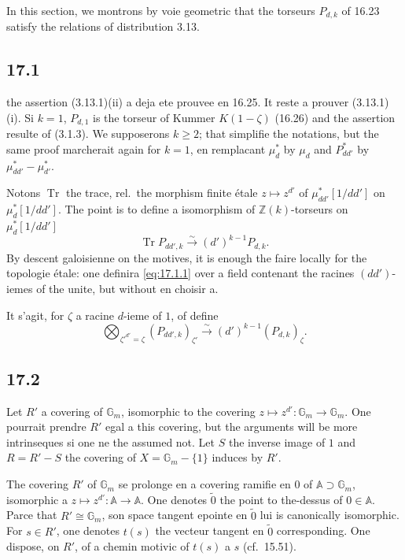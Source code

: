 \documentclass[12pt,a4paper]{article}
\theoremstyle{plain}
\theoremstyle{definition}
\theoremstyle{remark}
\DeclareMathOperator{\Tr}{Tr}
\newcommand{\Gm}{\mathbb{G}_m}
\newcommand{\ZZ}{\mathbb{Z}}
\newcommand{\GA}{\mathbb{A}}
\begin{document}
In this section, we montrons by voie geometric that the
torseurs $P_{d,k}$ of 16.23 satisfy the relations of distribution 3.13.

\subsection{17.1}

the assertion (3.13.1)(ii) a deja ete prouvee en 16.25. It reste a
prouver (3.13.1)(i). Si $k=1$, $P_{d,1}$ is the torseur of Kummer
$K(1-\zeta)$ (16.26) and the assertion resulte of (3.1.3). We
supposerons $k \geq 2$; that simplifie the notations, but the same
proof marcherait again for $k=1$, en remplacant $\mu_d^*$ by
$\mu_d$ and $P_{dd'}^*$ by $\mu_{dd'}^* - \mu_{d'}^*$.

Notons $\Tr$ the trace, rel.\ the morphism finite étale
$z \mapsto z^{d'}$ of $\mu_{dd'}^*[1/dd']$ on $\mu_d^*[1/dd']$. The point is to define a isomorphism of $\ZZ(k)$-torseurs on
$\mu_d^*[1/dd']$
\begin{equation}\label{eq:17.1.1}
\Tr P_{dd',k} \xrightarrow{\sim} (d')^{k-1} P_{d,k}.
\end{equation}
By descent galoisienne on the motives, it is enough the faire locally
for the topologie étale: one definira \eqref{eq:17.1.1} over a field
contenant the racines $(dd')$-iemes of the unite, but without en choisir
a.

It s'agit, for $\zeta$ a racine $d$-ieme of $1$, of define
\begin{equation}\label{eq:17.1.2}
\bigotimes_{\zeta'^{d'}=\zeta} (P_{dd',k})_{\zeta'}
\xrightarrow{\sim} (d')^{k-1}(P_{d,k})_\zeta.
\end{equation}

\subsection{17.2}

Let $R'$ a covering of $\Gm$, isomorphic to the covering
$z \mapsto z^{d'} : \Gm \to \Gm$. One pourrait prendre $R'$ egal a this
covering, but the arguments will be more intrinseques si one ne the
assumed not. Let $S$ the inverse image of $1$ and $R = R' - S$ the
covering of $X = \Gm - \{1\}$ induces by $R'$.

The covering $R'$ of $\Gm$ se prolonge en a covering ramifie en
$0$ of $\GA \supset \Gm$, isomorphic a $z \mapsto z^{d'} : \GA \to \GA$.
One denotes $\tilde{0}$ the point to the-dessus of $0 \in \GA$. Parce that
$R' \cong \Gm$, son space tangent epointe en $\tilde{0}$ lui is
canonically isomorphic. For $s \in R'$, one denotes $t(s)$ the vecteur
tangent en $\tilde{0}$ corresponding. One dispose, on $R'$, of a chemin
motivic of $t(s)$ a $s$ (cf.\ 15.51).
\end{document}
